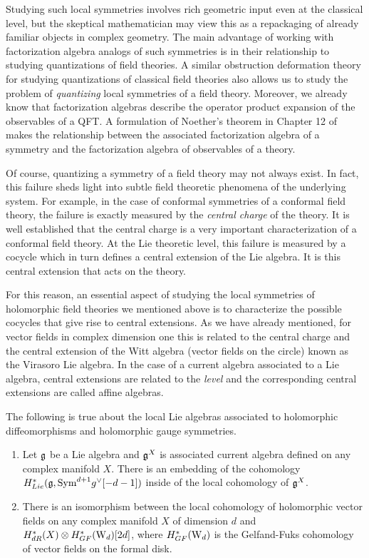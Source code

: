 Studying such local symmetries involves rich geometric input even at the classical level, but the skeptical mathematician may view this as a repackaging of already familiar objects in complex geometry.
The main advantage of working with factorization algebra analogs of such symmetries is in their relationship to studying quantizations of field theories.
A similar obstruction deformation theory for studying quantizations of classical field theories also allows us to study the problem of {\em quantizing} local symmetries of a field theory.
Moreover, we already know that factorization algebras describe the operator product expansion of the observables of a QFT.
A formulation of Noether's theorem in Chapter 12 of \cite{CG2} makes the relationship between the associated factorization algebra of a symmetry and the factorization algebra of observables of a theory.

Of course, quantizing a symmetry of a field theory may not always exist.
In fact, this failure sheds light into subtle field theoretic phenomena of the underlying system. 
For example, in the case of conformal symmetries of a conformal field theory, the failure is exactly measured by the {\em central charge} of the theory. 
It is well established that the central charge is a very important characterization of a conformal field theory.
At the Lie theoretic level, this failure is measured by a cocycle which in turn defines a central extension of the Lie algebra. 
It is this central extension that acts on the theory. 

For this reason, an essential aspect of studying the local symmetries of holomorphic field theories we mentioned above is to characterize the possible cocycles that give rise to central extensions. 
As we have already mentioned, for vector fields in complex dimension one this is related to the central charge and the central extension of the Witt algebra (vector fields on the circle) known as the Virasoro Lie algebra.
In the case of a current algebra associated to a Lie algebra, central extensions are related to the {\em level} and the corresponding central extensions are called affine algebras. 

\begin{thm}\label{thm: chap3 1}
The following is true about the local Lie algebras associated to holomorphic diffeomorphisms and holomorphic gauge symmetries.
\begin{enumerate}
\item Let $\mathfrak g$ be a Lie algebra and $\mathfrak g^X$ is associated current algebra defined on any complex manifold $X$. 
There is an embedding of the cohomology $H^*_{Lie}(\mathfrak g , {\rm Sym}^{d+1} g^\vee [-d-1])$ inside of the local cohomology of $\mathfrak g^X$.
\item There is an isomorphism between the local cohomology of holomorphic vector fields on any complex manifold $X$ of dimension $d$ and $H_{dR}^*(X) \otimes H^*_{GF}({\rm W}_d)[2d]$, where  $H^*_{GF}({\rm W}_d)$ is the Gelfand-Fuks cohomology of vector fields on the formal disk.
\end{enumerate}
\end{thm}


